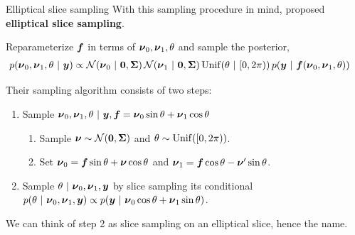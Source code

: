 \documentclass[aspectratio=169]{beamer}
\begin{document}
\begin{frame}{Elliptical slice sampling}
With this sampling procedure in mind, \citet{Murray2010-zb} proposed \textbf{elliptical slice sampling}. 

Reparameterize $\boldsymbol{f}$ in terms of $\boldsymbol{\nu}_0, \boldsymbol{\nu}_1, \theta$ and sample the posterior,
\begin{align}
    p(\boldsymbol{\nu}_0, \boldsymbol{\nu}_1, \theta ~\vert~ \boldsymbol{y}) &\propto 
    \mathcal{N}(\boldsymbol{\nu}_0 ~\vert~ \boldsymbol{0}, \boldsymbol{\Sigma}) \,
    \mathcal{N}(\boldsymbol{\nu}_1 ~\vert~ \boldsymbol{0}, \boldsymbol{\Sigma}) \,
    \mathrm{Unif}(\theta ~\vert~ [0, 2 \pi)) \,
    p(\boldsymbol{y} ~\vert~ \boldsymbol{f}(\boldsymbol{\nu}_0, \boldsymbol{\nu}_1, \theta))
\end{align}

Their sampling algorithm consists of two steps:
\begin{enumerate}
    \item Sample $\boldsymbol{\nu}_0, \boldsymbol{\nu}_1, \theta ~\vert~ \boldsymbol{y}, \boldsymbol{f} = \boldsymbol{\nu}_0 \sin \theta + \boldsymbol{\nu}_1 \cos \theta$ 
    \begin{enumerate}
        \item Sample $\boldsymbol{\nu} \sim \mathcal{N}(\boldsymbol{0}, \boldsymbol{\Sigma})$ and $\theta \sim \mathrm{Unif}([0, 2\pi))$. 
        \item Set $\boldsymbol{\nu}_0 = \boldsymbol{f} \sin \theta + \boldsymbol{\nu} \cos \theta$ and $\boldsymbol{\nu}_1 = \boldsymbol{f} \cos \theta - \boldsymbol{\nu}' \sin \theta$.
    \end{enumerate}
    \item Sample $\theta ~\vert~ \boldsymbol{\nu}_0, \boldsymbol{\nu}_1, \boldsymbol{y}$ by slice sampling its conditional $p(\theta ~\vert~ \boldsymbol{\nu}_0, \boldsymbol{\nu}_1, \boldsymbol{y}) \propto p(\boldsymbol{y} ~\vert~ \boldsymbol{\nu}_0 \cos \theta + \boldsymbol{\nu}_1 \sin \theta)$.
\end{enumerate}
We can think of step 2 as slice sampling on an elliptical slice, hence the name. 
\end{frame}
\end{document}
